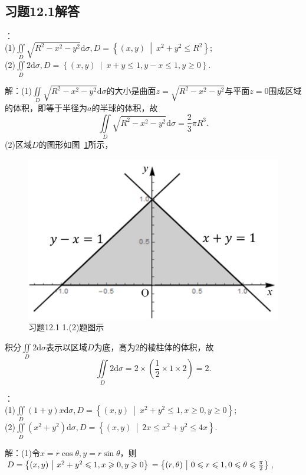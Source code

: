 \documentclass[12pt,UTF8]{ctexart}
\newcommand\Set[2]{\left\{#1\ \middle\vert\ #2 \right\}}
\newcommand{\aIInt}[1]{\iint\limits_{#1}}
\begin{document}
\subsection{习题12.1解答}
\begin{enumerate}
：\\
(1)$\aIInt{D}\sqrt{R^2-x^2-y^2}\mathrm d\sigma,D=\Set{(x,y)}{x^2+y^2\leqslant R^2}$;\\
(2)$\aIInt{D}2\mathrm d\sigma,D=\Set{(x,y)}{x+y\leqslant1,y-x\leqslant1,y\geqslant0}$.

解：(1)$\aIInt{D}\sqrt{R^2-x^2-y^2}\mathrm d\sigma$的大小是曲面$z=\sqrt{R^2-x^2-y^2}$与平面$z=0$围成区域的体积，即等于半径为$a$的半球的体积，故
\[\aIInt{D}\sqrt{R^2-x^2-y^2}\mathrm d\sigma=\frac23\pi R^3.\]
(2)区域$D$的图形如图~\ref{1-2}所示，
\begin{figure}[H]
\begin{center}
\includegraphics[height=0.2\textheight]{Figures/Fig1-2.png}
\end{center}
\caption{习题12.1 1.(2)题图示}
\label{1-2}
\end{figure}
积分$\aIInt{D}2\mathrm d\sigma$表示以区域$D$为底，高为$2$的棱柱体的体积，故
\[\aIInt{D}2\mathrm d\sigma=2\times(\frac12\times1\times2)=2.\]

：\\
(1)$\aIInt{D}(1+y)x\mathrm d\sigma,D=\Set{(x,y)}{x^2+y^2\leqslant1,x\geqslant0,y\geqslant0}$;\\
(2)$\aIInt{D}(x^2+y^2)\mathrm d\sigma,D=\Set{(x,y)}{2x\leqslant x^2+y^2\leqslant4x}$.

解：(1)令$x=r\cos\theta,y=r\sin\theta$，则$D=\Set{(x,y)}{x^2+y^2\leqslant1,x\geqslant0,y\geqslant0}\\
=\Set{(r,\theta)}{0\leqslant r\leqslant1,0\leqslant\theta\leqslant\frac\pi2}$,


\end{enumerate}
\end{document}
